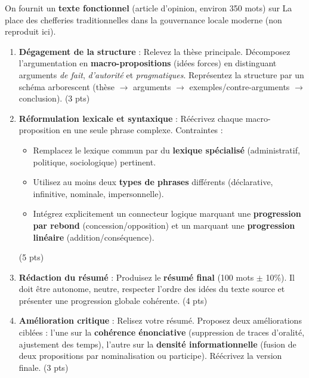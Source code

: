 \documentclass[11pt]{article}
\begin{document}
\begin{exercice}
On fournit un \textbf{texte fonctionnel} (article d'opinion, environ 350 mots) sur \og La place des chefferies traditionnelles dans la gouvernance locale moderne \fg (non reproduit ici).
\begin{enumerate}
    \item \textbf{Dégagement de la structure} : Relevez la thèse principale. Décomposez l'argumentation en \textbf{macro-propositions} (idées forces) en distinguant arguments \textit{de fait}, \textit{d'autorité} et \textit{pragmatiques}. Représentez la structure par un schéma arborescent (thèse $\to$ arguments $\to$ exemples/contre-arguments $\to$ conclusion). (3 pts)
    \item \textbf{Réformulation lexicale et syntaxique} : Réécrivez chaque macro-proposition en une seule phrase complexe. Contraintes : 
    \begin{itemize}
        \item Remplacez le lexique commun par du \textbf{lexique spécialisé} (administratif, politique, sociologique) pertinent.
        \item Utilisez au moins deux \textbf{types de phrases} différents (déclarative, infinitive, nominale, impersonnelle).
        \item Intégrez explicitement un connecteur logique marquant une \textbf{progression par rebond} (concession/opposition) et un marquant une \textbf{progression linéaire} (addition/conséquence).
    \end{itemize}
    (5 pts)
    \item \textbf{Rédaction du résumé} : Produisez le \textbf{résumé final} (100 mots $\pm$ 10\%). Il doit être autonome, neutre, respecter l'ordre des idées du texte source et présenter une progression globale cohérente. (4 pts)
    \item \textbf{Amélioration critique} : Relisez votre résumé. Proposez deux améliorations ciblées : l'une sur la \textbf{cohérence énonciative} (suppression de traces d'oralité, ajustement des temps), l'autre sur la \textbf{densité informationnelle} (fusion de deux propositions par nominalisation ou participe). Réécrivez la version finale. (3 pts)
\end{enumerate}
\end{exercice}
\end{document}
